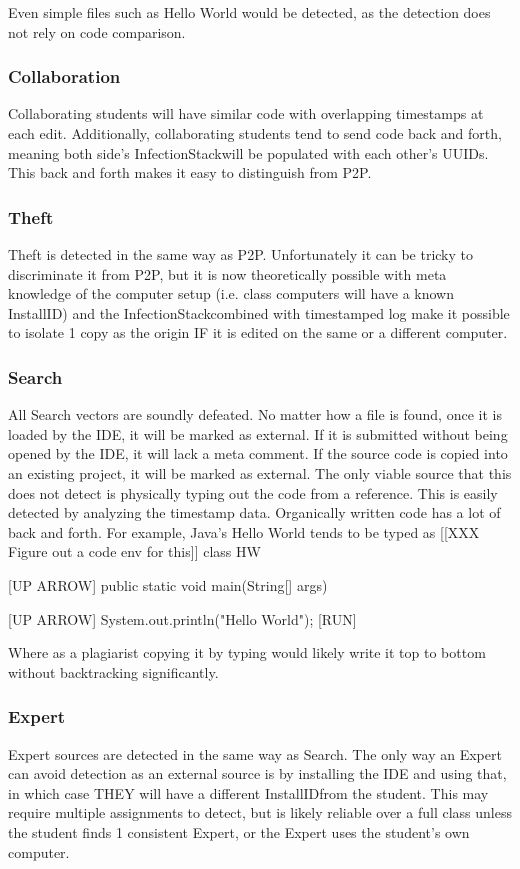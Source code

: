 \documentclass[conference]{IEEEtran}
\newcommand{\installID}{InstallID}
\newcommand{\infectionStack}{InfectionStack}
\begin{document}
		Even simple files such as Hello World would be detected, as the detection does not rely on code comparison.
	\subsubsection*{\textbf{Collaboration}}\hfill\break\indent
		Collaborating students will have similar code with overlapping timestamps at each edit.  Additionally, collaborating students tend to send code back and forth, meaning both side's \infectionStack will be populated with each other's UUIDs.  This back and forth makes it easy to distinguish from P2P.
	\subsubsection*{\textbf{Theft}}\hfill\break\indent
	Theft is detected in the same way as P2P.  Unfortunately it can be tricky to discriminate it from P2P, but it is now theoretically possible with meta knowledge of the computer setup (i.e. class computers will have a known \installID) and the \infectionStack combined with timestamped log make it possible to isolate 1 copy as the origin IF it is edited on the same or a different computer.  
	\subsubsection*{\textbf{Search}}\hfill\break\indent
		All Search vectors are soundly defeated.  No matter how a file is found, once it is loaded by the IDE, it will be marked as external. If it is submitted without being opened by the IDE, it will lack a meta comment.  If the source code is copied into an existing project, it will be marked as external.  The only viable source that this does not detect is physically typing out the code from a reference.  This is easily detected by analyzing the timestamp data.  Organically written code has a lot of back and forth.  For example, Java's Hello World tends to be typed as 
		[[XXX Figure out a code env for this]]
		class HW{
		
		}
		[UP ARROW]
		public static void main(String[] args){
		
		}
		[UP ARROW]
		System.out.println("Hello World");
		[RUN]
		
		Where as a plagiarist copying it by typing would likely write it top to bottom without backtracking significantly.
	\subsubsection*{\textbf{Expert} }\hfill\break\indent
	Expert sources are detected in the same way as Search.  The only way an Expert can avoid detection as an external source is by installing the IDE and using that, in which case THEY will have a different \installID from the student.  This may require multiple assignments to detect, but is likely reliable over a full class unless the student finds 1 consistent Expert, or the Expert uses the student's own computer.
\end{document}

